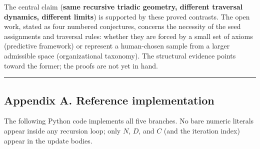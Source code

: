 \documentclass[12pt]{article}
\begin{document}
The central claim (\textbf{same recursive triadic geometry, different
traversal dynamics, different limits}) is supported by these proved
contrasts. The open work, stated as four numbered conjectures, concerns
the necessity of the seed assignments and traversal rules: whether they
are forced by a small set of axioms (predictive framework) or represent
a human-chosen sample from a larger admissible space (organizational
taxonomy). The structural evidence points toward the former; the proofs
are not yet in hand.

\begin{center}\rule{0.5\linewidth}{0.5pt}\end{center}

\subsection{Appendix A. Reference
implementation}\label{appendix-a.-reference-implementation}

The following Python code implements all five branches. No bare numeric
literals appear inside any recursion loop; only \(N\), \(D\), and \(C\)
(and the iteration index) appear in the update bodies.
\end{document}

